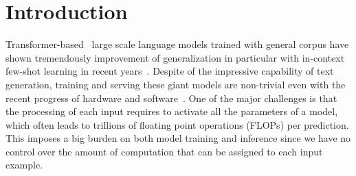 \documentclass{article}
\begin{document}
\printAffiliationsAndNotice{}  %

\begin{abstract}

Overparameterized large-scale language models have impressive generalization performance of in-context few-shot learning. However, most language models allocate the same amount of parameters or computation to each token, disregarding the complexity or importance of the input data. We argue that in language model pretraining, a variable amount of computation should be assigned to different tokens, and this can be efficiently achieved via a simple routing mechanism. Different from conventional early stopping techniques where tokens can early exit at only early layers, we propose a more general method that dynamically skips the execution of a layer (or module) for any input token with a binary router. In our extensive evaluation across 24 NLP tasks, we demonstrate that the proposed method can significantly improve the 1-shot performance compared to other competitive baselines only at mild extra cost for inference.



\end{abstract}

\section{Introduction}
\label{sec:intro}
Transformer-based~\cite{vaswani2017attention} large scale language models trained with general corpus have shown tremendously improvement of generalization in particular with in-context few-shot learning in recent years~\cite{shoeybi2019megatron, NEURIPS2020_gpt3, gopher2021, palm, hoffmann2022an}.
%
Despite of the impressive capability of text generation, training and serving these giant models are non-trivial even with the recent progress of hardware and software~\cite{jouppi2017datacenter,lepikhin2020gshard, patterson2021carbon}. One of the major challenges is that the processing of each input requires to activate all the parameters of a model, which often leads to trillions of floating point operations (FLOPs) per prediction. This imposes a big burden on both model training and inference since we have no control over the amount of computation that can be assigned to each input example.
\end{document}
